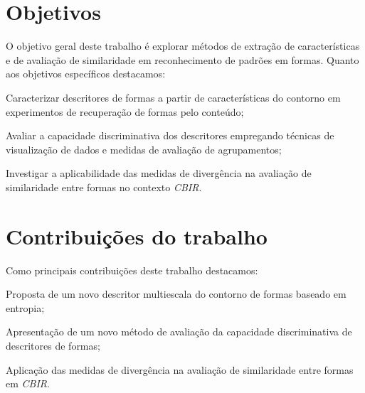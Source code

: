 

\section*{Objetivos}
O objetivo geral deste trabalho é explorar métodos de extração de características e de avaliação de similaridade em reconhecimento de padrões em formas. Quanto aos objetivos específicos destacamos:

\begin{alineas}
\item Caracterizar descritores de formas a partir de características do contorno em experimentos de recuperação de formas pelo conteúdo;

\item Avaliar a capacidade discriminativa dos descritores empregando técnicas de visualização de dados e medidas de avaliação de agrupamentos;  

\item Investigar a aplicabilidade das medidas de divergência na avaliação de similaridade entre formas no contexto \emph{CBIR}.
\end{alineas}

\section*{Contribuições do trabalho}

Como principais contribuições deste trabalho destacamos:

\begin{alineas}
\item Proposta de um novo descritor multiescala do contorno de formas baseado em entropia;
\item Apresentação de um novo método de avaliação da capacidade discriminativa de descritores de formas;
\item Aplicação das medidas de divergência na avaliação de similaridade entre formas em \emph{CBIR}.
\end{alineas}



